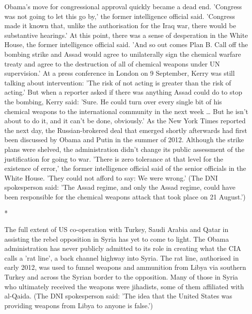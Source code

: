 Obama's move for congressional approval quickly became a dead end.
'Congress was not going to let this go by,' the former intelligence
official said. 'Congress made it known that, unlike the authorisation
for the Iraq war, there would be substantive hearings.' At this point,
there was a sense of desperation in the White House, the former intelligence
official said. 'And so out comes Plan B. Call off the bombing strike
and Assad would agree to unilaterally sign the chemical warfare treaty
and agree to the destruction of all of chemical weapons under UN supervision.'
At a press conference in London on 9 September, Kerry was still talking
about intervention: 'The risk of not acting is greater than the risk
of acting.' But when a reporter asked if there was anything Assad
could do to stop the bombing, Kerry said: 'Sure. He could turn over
every single bit of his chemical weapons to the international community
in the next week \ldots{} But he isn't about to do it, and it can't
be done, obviously.' As the New York Times reported the next day,
the Russian-brokered deal that emerged shortly afterwards had first
been discussed by Obama and Putin in the summer of 2012. Although
the strike plans were shelved, the administration didn't change its
public assessment of the justification for going to war. 'There is
zero tolerance at that level for the existence of error,' the former
intelligence official said of the senior officials in the White House.
'They could not afford to say: \textquotedbl{}We were wrong.\textquotedbl{}'
(The DNI spokesperson said: 'The Assad regime, and only the Assad
regime, could have been responsible for the chemical weapons attack
that took place on 21 August.')

{*}

The full extent of US co-operation with Turkey, Saudi Arabia and Qatar
in assisting the rebel opposition in Syria has yet to come to light.
The Obama administration has never publicly admitted to its role in
creating what the CIA calls a 'rat line', a back channel highway into
Syria. The rat line, authorised in early 2012, was used to funnel
weapons and ammunition from Libya via southern Turkey and across the
Syrian border to the opposition. Many of those in Syria who ultimately
received the weapons were jihadists, some of them affiliated with
al-Qaida. (The DNI spokesperson said: 'The idea that the United States
was providing weapons from Libya to anyone is false.')

